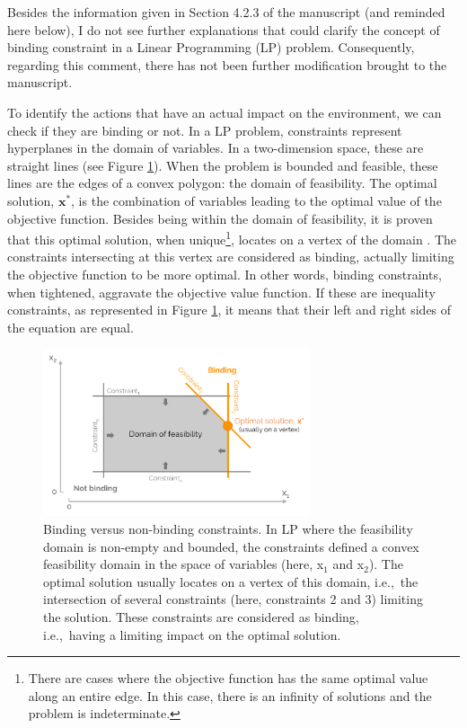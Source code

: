 \documentclass[12pt,a4paper]{article}
\def\ie{i.e.,\ }
\begin{document}
\noindent
Besides the information given in Section 4.2.3 of the manuscript (and reminded here below), I do not see further explanations that could clarify the concept of binding constraint in a Linear Programming (LP) problem. Consequently, regarding this comment, there has not been further modification brought to the manuscript.


\begin{mdframed}[style=manuscript] %
To identify the actions that have an actual impact on the environment, we can check if they are binding or not. In a LP problem, constraints represent hyperplanes in the domain of variables. In a two-dimension space, these are straight lines (see Figure \ref{fig:Binding_constr}). When the problem is bounded and feasible, these lines are the edges of a convex polygon: the domain of feasibility. The optimal solution, $\textbf{x}^*$, is the combination of variables leading to the optimal value of the objective function. Besides being within the domain of feasibility, it is proven that this optimal solution, when unique\footnote{There are cases where the objective function has the same optimal value along an entire edge. In this case, there is an infinity of solutions and the problem is indeterminate.}, locates on a vertex of the domain \cite{bertsimas1997introduction}. The constraints intersecting at this vertex are considered as binding, actually limiting the objective function to be more optimal. In other words, binding constraints, when tightened, aggravate the objective value function. If these are inequality constraints, as represented in Figure \ref{fig:Binding_constr}, it means that their left and right sides of the equation are equal.
\end{mdframed}

\begin{figure}[!htbp]
\centering
\includegraphics[width=0.7\textwidth]{Binding_constr.pdf}
\caption{Binding versus non-binding constraints. In LP where the feasibility domain is non-empty and bounded, the constraints defined a convex feasibility domain in the space of variables (here, x$_1$ and x$_2$). The optimal solution usually locates on a vertex of this domain, \ie the intersection of several constraints (here, constraints 2 and 3) limiting the solution. These constraints are considered as binding, \ie having a limiting impact on the optimal solution.}
\label{fig:Binding_constr}
\end{figure}
\end{document}
